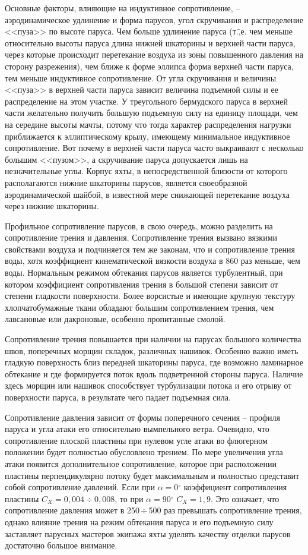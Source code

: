 \documentclass[a4paper, 12pt, twoside, final, book, russian, fittopage, cyremdash]{ncc}
\newcommand{\gr}{\ensuremath{^\circ}\xspace}
\newcommand{\otdo}{\,\ensuremath{\div}\,}
\newcommand{\motdo}{\div}
\begin{document}
Основные факторы, влияющие на индуктивное сопротивление, \--- аэродинамическое удлинение и форма парусов, угол скручивания и распределение <<пуза>> по высоте паруса. Чем больше удлинение паруса (т.\=,е. чем меньше относительно высоты паруса длина нижней шкаторины и верхней части паруса, через которые происходит перетекание воздуха из зоны повышенного давления на сторону разрежения), чем ближе к форме эллипса форма верхней части паруса, тем меньше индуктивное сопротивление. От угла скручивания и величины <<пуза>> в верхней части паруса зависит величина подъемной силы и ее распределение на этом участке. У треугольного бермудского паруса в верхней части желательно получить большую подъемную силу на единицу площади, чем на середине высоты мачты, потому что тогда характер распределения нагрузки приближается к эллиптическому крылу, имеющему минимальное индуктивное сопротивление. Вот почему в верхней части паруса часто выкраивают с несколько большим <<пузом>>, а скручивание паруса допускается лишь на незначительные углы. Корпус яхты, в непосредственной близости от которого располагаются нижние шкаторины парусов, является своеобразной аэродинамической шайбой, в известной мере снижающей перетекание воздуха через нижние шкаторины. 

Профильное сопротивление парусов, в свою очередь, можно разделить на сопротивление трения и давления. Сопротивление трения вызвано вязкими свойствами воздуха и подчиняется тем же законам, что и сопротивление трения воды, хотя коэффициент кинематической вязкости воздуха в 860 раз меньше, чем воды. Нормальным режимом обтекания парусов является турбулентный, при котором коэффициент сопротивления трения в большой степени зависит от степени гладкости поверхности. Более ворсистые и имеющие крупную текстуру хлопчатобумажные ткани обладают большим сопротивлением трения, чем лавсановые или дакроновые, особенно пропитанные смолой. 

Сопротивление трения повышается при наличии на парусах большого количества швов, поперечных морщин складок, различных нашивок. Особенно важно иметь гладкую поверхность близ передней шкаторины паруса, где возможно ламинарное обтекание и где формируется поток вдоль подветренной стороны паруса. Наличие здесь морщин или нашивок способствует турбулизации потока и его отрыву от поверхности паруса, в результате чего падает подъемная сила. 

Сопротивление давления зависит от формы поперечного сечения \--- профиля паруса и угла атаки его относительно вымпельного ветра. Очевидно, что сопротивление плоской пластины при нулевом угле атаки во флюгерном положении будет полностью обусловлено трением. По мере увеличения угла атаки появится дополнительное сопротивление, которое при расположении пластины перпендикулярно потоку будет максимальным и полностью представит собой сопротивление давлений. Если при $\alpha = 0\gr$ коэффициент сопротивления пластины $C_X = 0,004\motdo 0,008$, то при $\alpha = 90\gr$ $C_X = 1,9$. Это означает, что сопротивление давления может в 250\otdo 500 раз превышать сопротивление трения, однако влияние трения на режим обтекания паруса и его подъемную силу заставляет парусных мастеров экипажа яхты уделять качеству отделки парусов достаточно большое внимание.
\end{document}
